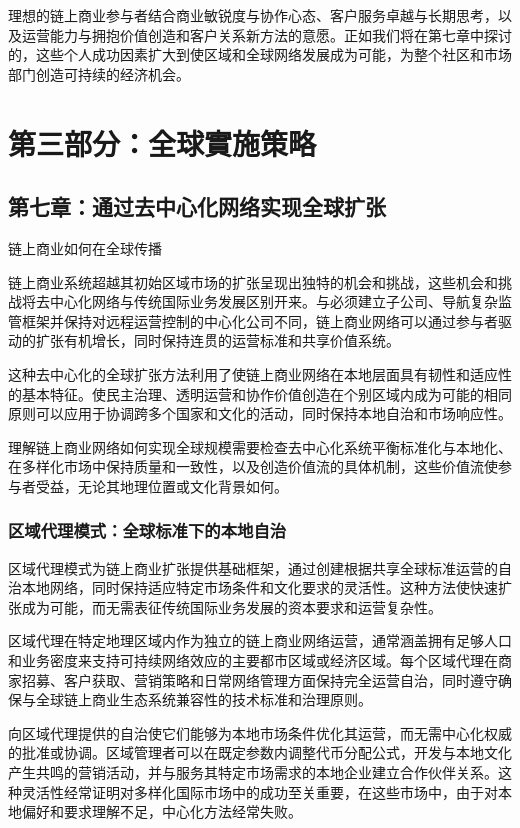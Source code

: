 \documentclass[
  Letterpaper,
]{scrbook}
\begin{document}
理想的链上商业参与者结合商业敏锐度与协作心态、客户服务卓越与长期思考，以及运营能力与拥抱价值创造和客户关系新方法的意愿。正如我们将在第七章中探讨的，这些个人成功因素扩大到使区域和全球网络发展成为可能，为整个社区和市场部门创造可持续的经济机会。

\part{第三部分：全球實施策略}

\chapter{第七章：通过去中心化网络实现全球扩张}\label{sec-global-expansion}

链上商业如何在全球传播

链上商业系统超越其初始区域市场的扩张呈现出独特的机会和挑战，这些机会和挑战将去中心化网络与传统国际业务发展区别开来。与必须建立子公司、导航复杂监管框架并保持对远程运营控制的中心化公司不同，链上商业网络可以通过参与者驱动的扩张有机增长，同时保持连贯的运营标准和共享价值系统。

这种去中心化的全球扩张方法利用了使链上商业网络在本地层面具有韧性和适应性的基本特征。使民主治理、透明运营和协作价值创造在个别区域内成为可能的相同原则可以应用于协调跨多个国家和文化的活动，同时保持本地自治和市场响应性。

理解链上商业网络如何实现全球规模需要检查去中心化系统平衡标准化与本地化、在多样化市场中保持质量和一致性，以及创造价值流的具体机制，这些价值流使参与者受益，无论其地理位置或文化背景如何。

\section{区域代理模式：全球标准下的本地自治}\label{ux533aux57dfux4ee3ux7406ux6a21ux5f0fux5168ux7403ux6807ux51c6ux4e0bux7684ux672cux5730ux81eaux6cbb}

区域代理模式为链上商业扩张提供基础框架，通过创建根据共享全球标准运营的自治本地网络，同时保持适应特定市场条件和文化要求的灵活性。这种方法使快速扩张成为可能，而无需表征传统国际业务发展的资本要求和运营复杂性。

区域代理在特定地理区域内作为独立的链上商业网络运营，通常涵盖拥有足够人口和业务密度来支持可持续网络效应的主要都市区域或经济区域。每个区域代理在商家招募、客户获取、营销策略和日常网络管理方面保持完全运营自治，同时遵守确保与全球链上商业生态系统兼容性的技术标准和治理原则。

向区域代理提供的自治使它们能够为本地市场条件优化其运营，而无需中心化权威的批准或协调。区域管理者可以在既定参数内调整代币分配公式，开发与本地文化产生共鸣的营销活动，并与服务其特定市场需求的本地企业建立合作伙伴关系。这种灵活性经常证明对多样化国际市场中的成功至关重要，在这些市场中，由于对本地偏好和要求理解不足，中心化方法经常失败。
\end{document}
